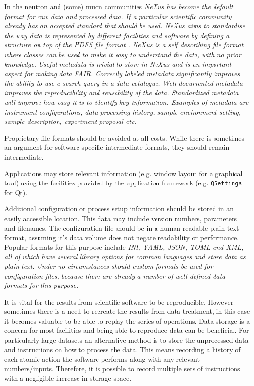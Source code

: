 \documentclass[jnr]{iosart2x}
\begin{document}
In the neutron and (some) muon communities \it NeXus \cite{K_nnecke_2015} has become the default format for raw data and processed data.
If a particular scientific community already has an accepted standard that should be used.
\it NeXus aims to standardise the way data is represented by different facilities and software by defining a structure on top of the \it HDF5 file format \cite{HDF5}.
\it NeXus is a self describing file format where classes can be used to make it easy to understand the data, with no prior knowledge.
Useful metadata is trivial to store in NeXus and is an important aspect for making data FAIR.
Correctly labeled metadata significantly improves the ability to use a search query in a data catalogue.
Well documented metadata improves the reproducibility and reusability of the data.
Standardized metadata will improve how easy it is to identify key information.
Examples of metadata are instrument configurations, data processing history, sample environment setting, sample description, experiment proposal etc.

Proprietary file formats should be avoided at all costs.
While there is sometimes an argument for software specific intermediate formats, they should remain intermediate.

Applications may store relevant information (e.g. window layout for a graphical tool) using the facilities provided by the application framework (e.g. \texttt{QSettings} for Qt).

Additional configuration or process setup information should be stored in an easily accessible location.
This data may include version numbers, parameters and filenames.
The configuration file should be in a human readable plain text format, assuming it's data volume does not negate readability or performance.
Popular formats for this purpose include \it INI, \it YAML, \it JSON, \it TOML and \it XML, all of which have several library options for common languages and store data as plain text.
Under no circumstances should custom formats be used for configuration files, because there are already a number of well defined data formats for this purpose.

It is vital for the results from scientific software to be reproducible.
However, sometimes there is a need to recreate the results from data treatment, in this case it becomes valuable to be able to replay the series of operations.
Data storage is a concern for most facilities and being able to reproduce data can be beneficial.
For particularly large datasets an alternative method is to store the unprocessed data and instructions on how to process the data.
This means recording a history of each atomic action the software performs along with any relevant numbers/inputs.
Therefore, it is possible to record multiple sets of instructions with a negligible increase in storage space.
\end{document}
